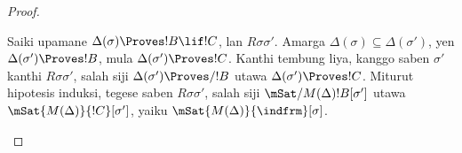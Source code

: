 \documentclass[../../../include/open-logic-section]{subfiles}
\begin{document}
\begin{proof}
\begin{enumerate}
{        Saiki upamane $\Delta(\sigma) \Proves !B \lif !C$, lan
        $R\sigma\sigma'$. Amarga $\Delta(\sigma) \subseteq \Delta(\sigma')$,
        yen $\Delta(\sigma') \Proves !B$, mula $\Delta(\sigma') \Proves !C$.
        Kanthi tembung liya, kanggo saben $\sigma'$ kanthi $R\sigma\sigma'$,
        salah siji $\Delta(\sigma') \Proves/ !B$ utawa
        $\Delta(\sigma') \Proves !C$. Miturut hipotesis induksi,
        tegese saben $R\sigma\sigma'$, salah siji
        $\mSat/{M(\Delta)}{!B}[\sigma']$ utawa
        $\mSat{M(\Delta)}{!C}[\sigma']$, yaiku
        $\mSat{M(\Delta)}{\indfrm}[\sigma]$.}
  \end{enumerate}
\end{proof}
\end{document}
